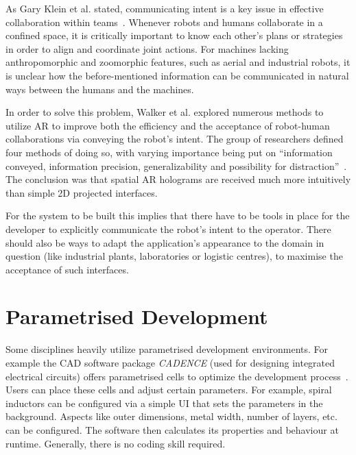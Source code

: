As Gary Klein et al. stated, communicating intent is a key issue in effective collaboration within teams~\cite{klein2005common}. Whenever robots and humans collaborate in a confined space, it is critically important to know each other’s plans or strategies in order to align and coordinate joint actions. For machines lacking anthropomorphic and zoomorphic features, such as aerial and industrial robots, it is unclear how the before-mentioned information can be communicated in natural ways between the humans and the machines.

In order to solve this problem, Walker et al. \cite{walker2018communicating} explored numerous methods to utilize AR to improve both the efficiency and the acceptance of robot-human collaborations via conveying the robot's intent. The group of researchers defined four methods of doing so, with varying importance being put on “information conveyed, information precision, generalizability and possibility for distraction”~\cite{walker2018communicating}. The conclusion was that spatial AR holograms are received much more intuitively than simple 2D projected interfaces.

For the system to be built this implies that there have to be tools in place for the developer to explicitly communicate the robot's intent to the operator. There should also be ways to adapt the application's appearance to the domain in question (like industrial plants, laboratories or logistic centres), to maximise the acceptance of such interfaces.

\section{Parametrised Development}\label{Section:ParametricDesignIntoduction}
Some disciplines heavily utilize parametrised development environments. For example the CAD software package \textit{CADENCE} (used for designing integrated electrical circuits) offers parametrised cells to optimize the development process~\cite{parametrizedCellElectricalInductor}. Users can place these cells and adjust certain parameters. For example, spiral inductors can be configured via a simple UI that sets the parameters in the background. Aspects like outer dimensions, metal width, number of layers, etc. can be configured. The software then calculates its properties and behaviour at runtime. Generally, there is no coding skill required.

